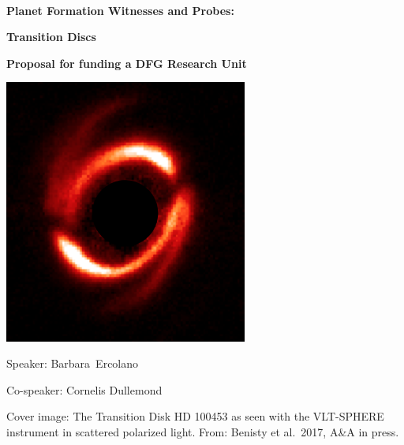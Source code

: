 \documentclass[10pt,fleqn,twoside]{article}
\newcommand{\Titlecol}{\color{Black}}
\begin{document}
\pagestyle{empty}
\mbox{}
\vspace{1cm}\\

\centerline{\Titlecol\huge \bf Planet Formation Witnesses and Probes:}
\vspace{0.5cm}
\centerline{\Titlecol\huge \bf Transition Discs}
\vspace{2cm}
\centerline{\Titlecol\Large \bf Proposal for funding a DFG Research Unit}
\vspace{2cm}
\centerline{\includegraphics[width=0.6\textwidth]{figures/HD100453.png}}
\vspace{1cm}
\centerline{\Large Speaker: Barbara~Ercolano}
\vspace{0.5cm}
\centerline{\Large Co-speaker: Cornelis Dullemond}


\pagebreak[4]

\mbox{}
\vfill
Cover image: The Transition Disk HD 100453 as seen with the VLT-SPHERE 
instrument in scattered polarized light. From: Benisty et al.~2017,
A\&A in press.


\pagebreak[4]
\end{document}
